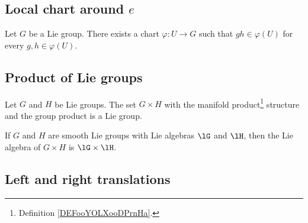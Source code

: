 \subsection{Local chart around \( e\)}


\begin{proposition}	\label{PROPooMRKDooNoQUad}
	Let \( G\) be a Lie group. There exists a chart \(\varphi \colon U\to G  \) such that \( gh\in \varphi(U)\) for every \( g,h\in \varphi(U)\).
\end{proposition}


\subsection{Product of Lie groups}

\begin{proposition}	\label{PROPooCKRIooZToMlN}
	Let \( G\) and \( H\) be Lie groups. The set \( G\times H\) with the manifold product\footnote{Definition \ref{DEFooYOLXooDPrnHa}.} structure and the group product is a Lie group.
\end{proposition}

\begin{proposition}     \label{PROPooKITOooTcsIiu}
	If \( G\) and \( H\) are smooth Lie groups with Lie algebras \( \lG\) and \( \lH\), then the Lie algebra of \( G\times H\) is \( \lG\times \lH\).
\end{proposition}

\subsection{Left and right translations}

